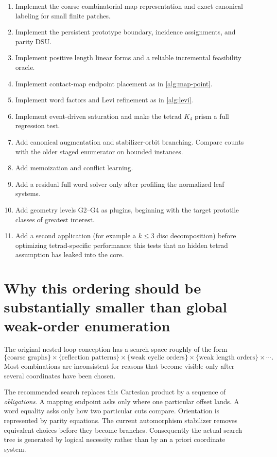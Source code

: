 \documentclass[11pt]{article}
\begin{document}
\begin{enumerate}[label=\textbf{D\arabic*.}]
  \item Implement the coarse combinatorial-map representation and exact canonical labeling for small finite patches.
  \item Implement the persistent prototype boundary, incidence assignments, and parity DSU.
  \item Implement positive length linear forms and a reliable incremental feasibility oracle.
  \item Implement contact-map endpoint placement as in \cref{alg:map-point}.
  \item Implement word factors and Levi refinement as in \cref{alg:levi}.
  \item Implement event-driven saturation and make the tetrad $K_4$ prism a full regression test.
  \item Add canonical augmentation and stabilizer-orbit branching.  Compare counts with the older staged enumerator on bounded instances.
  \item Add memoization and conflict learning.
  \item Add a residual full word solver only after profiling the normalized leaf systems.
  \item Add geometry levels G2--G4 as plugins, beginning with the target prototile classes of greatest interest.
  \item Add a second application (for example a $k\le3$ disc decomposition) before optimizing tetrad-specific performance; this tests that no hidden tetrad assumption has leaked into the core.
\end{enumerate}

\section{Why this ordering should be substantially smaller than global weak-order enumeration}

The original nested-loop conception has a search space roughly of the form
\[
  \{\text{coarse graphs}\}
  \times
  \{\text{reflection patterns}\}
  \times
  \{\text{weak cyclic orders}\}
  \times
  \{\text{weak length orders}\}
  \times\cdots.
\]
Most combinations are inconsistent for reasons that become visible only after several coordinates have been chosen.

The recommended search replaces this Cartesian product by a sequence of \emph{obligations}.  A mapping endpoint asks only where one particular offset lands.  A word equality asks only how two particular cuts compare.  Orientation is represented by parity equations.  The current automorphism stabilizer removes equivalent choices before they become branches.  Consequently the actual search tree is generated by logical necessity rather than by an a priori coordinate system.
\end{document}
